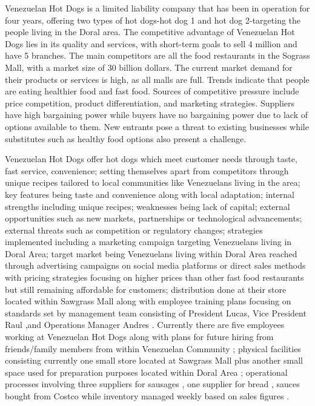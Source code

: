  

Venezuelan Hot Dogs is a limited liability company that has been in operation for four years, offering two types of hot dogs-hot dog 1 and hot dog 2-targeting the people living in the Doral area. The competitive advantage of Venezuelan Hot Dogs lies in its quality and services, with short-term goals to sell 4 million and have 5 branches. The main competitors are all the food restaurants in the Sograss Mall, with a market size of 30 billion dollars. The current market demand for their products or services is high, as all malls are full. Trends indicate that people are eating healthier food and fast food. Sources of competitive pressure include price competition, product differentiation, and marketing strategies. Suppliers have high bargaining power while buyers have no bargaining power due to lack of options available to them. New entrants pose a threat to existing businesses while substitutes such as healthy food options also present a challenge. 

Venezuelan Hot Dogs offer hot dogs which meet customer needs through taste, fast service, convenience; setting themselves apart from competitors through unique recipes tailored to local communities like Venezuelans living in the area; key features being taste and convenience along with local adaptation; internal strengths including unique recipes; weaknesses being lack of capital; external opportunities such as new markets, partnerships or technological advancements; external threats such as competition or regulatory changes; strategies implemented including a marketing campaign targeting Venezuelans living in Doral Area; target market being Venezuelans living within Doral Area reached through advertising campaigns on social media platforms or direct sales methods with pricing strategies focusing on higher prices than other fast food restaurants but still remaining affordable for customers; distribution done at their store located within Sawgrass Mall along with employee training plans focusing on standards set by management team consisting of President Lucas, Vice President Raul ,and Operations Manager Andres . Currently there are five employees working at Venezuelan Hot Dogs along with plans for future hiring from friends/family members from within Venezuelan Community ; physical facilities consisting currently one small store located at Sawgrass Mall plus another small space used for preparation purposes located within Doral Area ; operational processes involving three suppliers for sausages , one supplier for bread , sauces bought from Costco while inventory managed weekly based on sales figures . 

